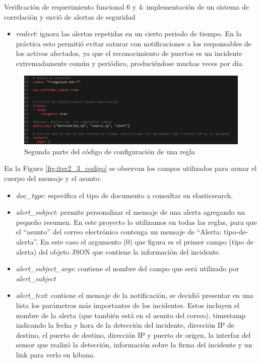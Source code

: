 \begin{section}{Verificación de requerimiento funcional 6 y 4: implementación de un sistema de correlación y envió de alertas de seguridad}
\begin{itemize}
        \item \textit{realert}: ignora las alertas repetidas en un cierto periodo de tiempo. En la práctica esto permitió evitar saturar con notificaciones a los responsables de los activos afectados, ya que el reconocimiento de puertos es un incidente extremadamente común y periódico, produciéndose muchas veces por día.
    \end{itemize}
    \begin{figure}[H]
    \centering
        \includegraphics[width=1\textwidth]{./iteracion_2_imagenes/4-codigoAlerta2.png}
        \caption{Segunda parte del código de configuración de una regla}
        \label{fig:iter2_2_codigo}
    \end{figure}
    \FloatBarrier
    En la Figura \ref{fig:iter2_3_codigo} se observan los campos utilizados para armar el cuerpo del mensaje y el asunto:
    \begin{itemize}
        \item \textit{doc\_type}: especifica el tipo de documento a consultar en elasticsearch.
        \item \textit{alert\_subject}: permite personalizar el mensaje de una alerta agregando un pequeño resumen. En este proyecto lo utilizamos en todas las reglas, para que el “asunto” del correo electrónico contenga un mensaje de “Alerta: tipo-de-alerta”. En este caso el argumento ({0}) que figura es el primer campo (tipo de alerta) del objeto JSON que contiene la información del incidente.
        \item \textit{alert\_subject\_args}: contiene el nombre del campo que será utilizado por \textit{alert\_subject}
        \item \textit{alert\_text}: contiene el mensaje de la notificación, se decidió presentar en una lista los parámetros más importantes de los incidentes. Estos incluyen el nombre de la alerta (que también está en el asunto del correo), timestamp indicando la fecha y hora de la detección del incidente, dirección IP de destino, el puerto de destino, dirección IP y puerto de origen, la interfaz del sensor que realizó la detección, información sobre la firma del incidente y un link para verlo en kibana.

\end{itemize}
\end{section}
